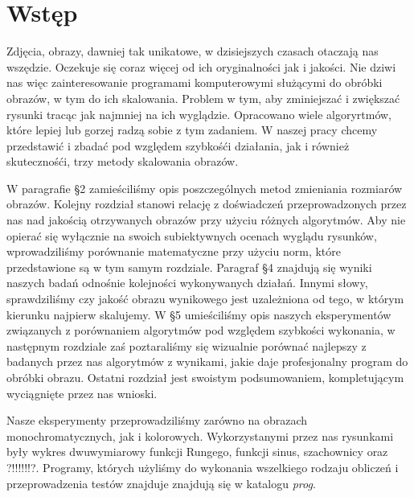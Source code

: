 \section{Wstęp}
Zdjęcia, obrazy, dawniej tak unikatowe, w dzisiejszych czasach otaczają nas
wszędzie. Oczekuje się coraz więcej od ich oryginalności jak i jakości. Nie
dziwi nas więc zainteresowanie programami komputerowymi służącymi do obróbki
obrazów, w tym do ich skalowania. Problem w tym, aby zminiejszać i zwiększać
rysunki tracąc jak najmniej na ich wyglądzie. Opracowano wiele algoryrtmów,
które lepiej lub gorzej radzą sobie z tym zadaniem. W naszej pracy chcemy
przedstawić i zbadać pod względem szybkośći działania, jak i również
skutecznośći, trzy metody skalowania obrazów.

W paragrafie \S2 zamieściliśmy opis poszczególnych metod zmieniania
rozmiarów obrazów. Kolejny rozdział stanowi relację z doświadczeń
przeprowadzonych przez nas nad jakością otrzywanych obrazów przy
użyciu różnych algorytmów. Aby nie opierać się wyłącznie na swoich
subiektywnych ocenach wyglądu rysunków, wprowadziliśmy porównanie
matematyczne przy użyciu norm, które przedstawione są w tym samym rozdziale.
Paragraf \S4 znajdują się wyniki naszych badań odnośnie kolejności
wykonywanych działań. Innymi słowy, sprawdziliśmy czy jakość obrazu
wynikowego jest uzależniona od tego, w którym kierunku najpierw skalujemy.
W \S5 umieściliśmy opis naszych eksperymentów związanych z porównaniem
algorytmów pod względem szybkości wykonania, w następnym rozdziale zaś
poztaraliśmy się wizualnie porównać najlepszy z badanych przez nas algorytmów
z wynikami, jakie daje profesjonalny program do obróbki obrazu. Ostatni
rozdział jest swoistym podsumowaniem, kompletującym wyciągnięte przez nas
wnioski.

Nasze eksperymenty przeprowadziliśmy zarówno na obrazach monochromatycznych,
jak i kolorowych. Wykorzystanymi przez nas rysunkami były wykres dwuwymiarowy
funkcji Rungego, funkcji sinus, szachownicy oraz ?!!!!!!?. Programy, których
użyliśmy do wykonania wszelkiego rodzaju obliczeń i przeprowadzenia testów
znajduje znajdują się w katalogu \textit{prog}.

